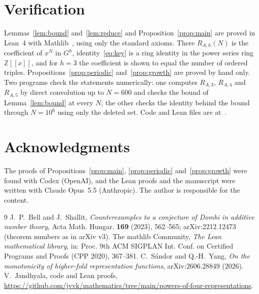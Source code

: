 \documentclass[11pt]{amsart}
\theoremstyle{remark}
\begin{document}
\section{Verification}

Lemmas~\ref{lem:bound} and~\ref{lem:reduce} and Proposition~\ref{prop:main} are proved in Lean~4 with Mathlib~\cite{mathlib}, using only the standard axioms. There $R_{A,h}(N)$ is the coefficient of $x^N$ in $G^h$, identity~\eqref{eq:key} is a ring identity in the power series ring $\mathbb Z[[x]]$, and for $h=3$ the coefficient is shown to equal the number of ordered triples. Propositions~\ref{prop:periodic} and~\ref{prop:growth} are proved by hand only. Two programs check the statements numerically: one computes $R_{A,3}$, $R_{A,4}$ and $R_{A,5}$ by direct convolution up to $N=600$ and checks the bound of Lemma~\ref{lem:bound} at every $N$; the other checks the identity behind the bound through $N=10^6$ using only the deleted set. Code and Lean files are at~\cite{repo}.

\section*{Acknowledgments}

The proofs of Propositions~\ref{prop:main}, \ref{prop:periodic} and~\ref{prop:growth} were found with Codex (OpenAI), and the Lean proofs and the manuscript were written with Claude Opus~5.5 (Anthropic). The author is responsible for the content.

\begin{thebibliography}{9}
 J.~P.~Bell and J.~Shallit, \emph{Counterexamples to a conjecture of Dombi in additive number theory}, Acta Math. Hungar. \textbf{169} (2023), 562--565; arXiv:2212.12473 (theorem numbers as in arXiv v3).
 The mathlib Community, \emph{The Lean mathematical library}, in: Proc. 9th ACM SIGPLAN Int. Conf. on Certified Programs and Proofs (CPP 2020), 367--381.
 C.~Sándor and Q.-H.~Yang, \emph{On the monotonicity of higher-fold representation functions}, arXiv:2606.28849 (2026).
 V.~Jandhyala, code and Lean proofs, \url{https://github.com/jvvk/mathematics/tree/main/powers-of-four-representations}.
\end{thebibliography}
\end{document}
